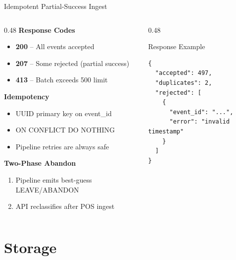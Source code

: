 \documentclass[aspectratio=169, 11pt]{beamer}
\begin{document}
\begin{frame}{Idempotent Partial-Success Ingest}
  \begin{columns}[T]
    \begin{column}{0.48\textwidth}
      \textbf{Response Codes}
      \begin{itemize}
        \item \textbf{200} -- All events accepted
        \item \textbf{207} -- Some rejected (partial success)
        \item \textbf{413} -- Batch exceeds 500 limit
      \end{itemize}

      \vspace{0.3cm}
      \textbf{Idempotency}
      \begin{itemize}
        \item UUID primary key on event\_id
        \item ON CONFLICT DO NOTHING
        \item Pipeline retries are always safe
      \end{itemize}

      \vspace{0.3cm}
      \textbf{Two-Phase Abandon}
      \begin{enumerate}
        \item Pipeline emits best-guess LEAVE/ABANDON
        \item API reclassifies after POS ingest
      \end{enumerate}
    \end{column}
    \begin{column}{0.48\textwidth}
      \begin{block}{Response Example}
\begin{lstlisting}[language={}]
{
  "accepted": 497,
  "duplicates": 2,
  "rejected": [
    {
      "event_id": "...",
      "error": "invalid timestamp"
    }
  ]
}
\end{lstlisting}
      \end{block}
    \end{column}
  \end{columns}
\end{frame}

\section{Storage}
\end{document}
